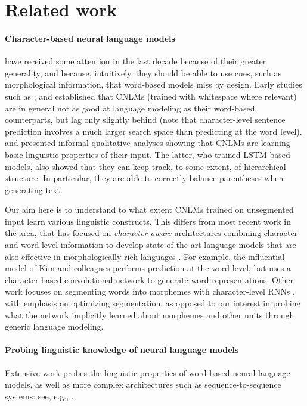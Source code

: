 \section{Related work}
\label{sec:related}

\paragraph{Character-based neural language models} have received some attention in the last
decade because of their greater generality, and because, intuitively, they should be able to
use cues, such as morphological information, that word-based models
miss by design. Early studies such as ,
 and  established
that CNLMs (trained with whitespace where relevant) are in general not
as good at language modeling as their word-based counterparts, but lag
only slightly behind (note that character-level sentence prediction
involves a much larger search space than predicting at the word
level).  and 
presented informal qualitative analyses showing that CNLMs are
learning basic linguistic properties of their input. The latter, who
trained LSTM-based models, also showed that they can keep track, to
some extent, of hierarchical structure. In particular, they are able
to correctly balance parentheses when generating text.

Our aim here is to understand to what extent CNLMs trained on
unsegmented input learn various linguistic constructs. This differs
from most recent work in the area, that has focused on \emph{character-aware}
architectures combining character- and word-level information to
develop state-of-the-art language models that are also effective in
morphologically rich languages \citep[see, e.g.,][and references
there]{Bojanowski:etal:2016,Kim:etal:2016,Gerz:etal:2018}. For
example, the influential model of Kim and colleagues performs
prediction at the word level, but uses a character-based convolutional
network to generate word representations. Other work focuses on
segmenting words into morphemes with character-level RNNs
\cite[e.g.,][]{Kann:etal:2016}, with emphasis on optimizing segmentation, as
opposed to our interest in probing what the network implicitly learned
about morphemes and other units through generic language
modeling.%


\paragraph{Probing linguistic knowledge of neural language models} Extensive work probes the linguistic properties of
word-based neural language models, as well as more complex
architectures such as sequence-to-sequence systems: see, e.g.,
.

